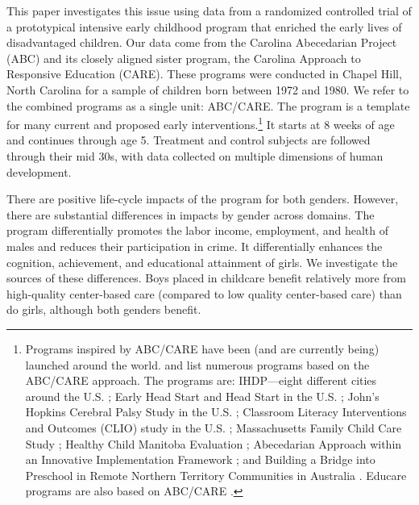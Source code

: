 This paper investigates this issue using data from a randomized controlled trial of a prototypical intensive early childhood program that enriched the early lives of disadvantaged children. Our data come from the Carolina Abecedarian Project (ABC) and its closely aligned sister program, the Carolina Approach to Responsive Education (CARE). These programs were conducted in Chapel Hill, North Carolina for a sample of children born between 1972 and 1980. We refer to the combined programs as a single unit: ABC/CARE. The program is a template for many current and proposed early interventions.\footnote{Programs inspired by ABC/CARE have been (and are currently being) launched around the world. \citet{Sparling_2010_Highlights} and \citet{Ramey_Ramey_Lanzi_2014_Interventions} list numerous programs based on the ABC/CARE approach. The programs are: IHDP---eight different cities around the U.S. \citep{Spiker-etal_1997_Helping}; Early Head Start and Head Start in the U.S. \citep{Schneider_McDonald-eds_2007_Scale-Up_Vol-1}; John's Hopkins Cerebral Palsy Study in the U.S. \citep{Sparling_2010_Highlights}; Classroom Literacy Interventions and Outcomes (CLIO) study in the U.S. \citep{Sparling_2010_Highlights}; Massachusetts Family Child Care Study \citep{Collins_etal_2010_Massachusetts-Study}; Healthy Child Manitoba Evaluation \citep{Healthy_Child_Manitoba_2015_Starting-Early}; Abecedarian Approach within an Innovative Implementation Framework \citep{Jensen_Nielsen_2016_ABC-Programme-Pilot}; and Building a Bridge into Preschool in Remote Northern Territory Communities in Australia \citep{UMonash_Dataset_2015_URL}. Educare programs are also based on ABC/CARE \citep{Educare_2014_Research_Agenda,Yazejian_Bryant_2012_Educare}.} It starts at 8 weeks of age and continues through age 5. Treatment and control subjects are followed through their mid 30s, with data collected on multiple dimensions of human development.

There are positive life-cycle impacts of the program for both genders. However, there are substantial differences in impacts by gender across domains. The program differentially promotes the labor income, employment, and health of males and reduces their participation in crime. It differentially enhances the cognition, achievement, and educational attainment of girls. We investigate the sources of these differences. Boys placed in childcare benefit relatively more from high-quality center-based care (compared to low quality center-based care) than do girls, although both genders benefit.

